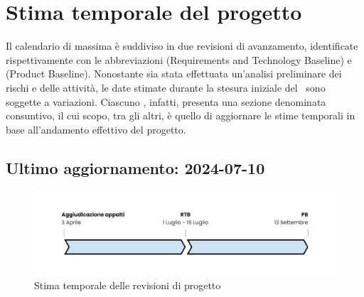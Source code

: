 \section{Stima temporale del progetto}
\label{sec:stima_temporale}

\par Il calendario di massima è suddiviso in due revisioni di avanzamento, identificate rispettivamente con le abbreviazioni  (Requirements and Technology Baseline) e  (Product Baseline). Nonostante sia stata effettuata un'analisi preliminare dei rischi e delle attività, le date stimate durante la stesura iniziale del \PdP\ sono soggette a variazioni. Ciascuno , infatti, presenta una sezione denominata consuntivo, il cui scopo, tra gli altri, è quello di aggiornare le stime temporali in base all'andamento effettivo del progetto.

\subsection{Ultimo aggiornamento: 2024-07-10}
\begin{figure}[H]
  \centering
  \includegraphics[width=\textwidth]{assets/stimatemporale.png}
  \caption{Stima temporale delle revisioni di progetto}\label{fig:stima-temporale}
\end{figure}
